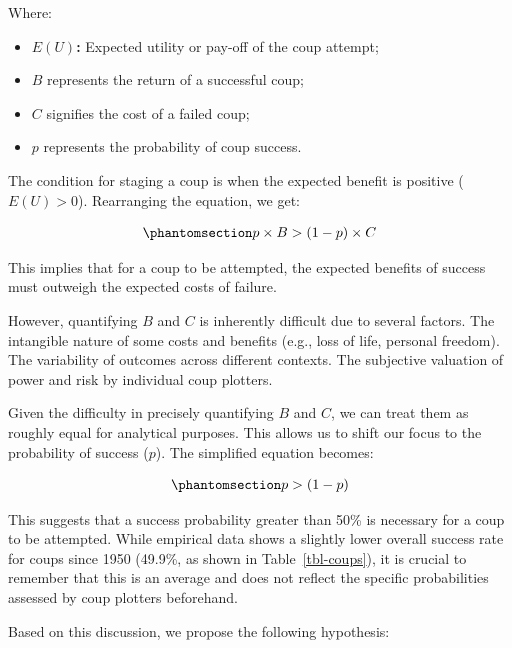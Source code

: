 \documentclass[
  12pt,
]{report}
\providecommand{\tightlist}{%
  \setlength{\itemsep}{0pt}\setlength{\parskip}{0pt}}\usepackage{longtable,booktabs,array}
\begin{document}
Where:

\begin{itemize}
\tightlist
\item
  \(E(U)\)\textbf{:} Expected utility or pay-off of the coup attempt;
\item
  \(B\) represents the return of a successful coup;
\item
  \(C\) signifies the cost of a failed coup;
\item
  \(p\) represents the probability of coup success.
\end{itemize}

The condition for staging a coup is when the expected benefit is
positive (\(E(U) > 0\)). Rearranging the equation, we get:

\begin{equation}\phantomsection\label{eq-eq2}{
\begin{aligned}
p \times B > (1 - p) \times C
\end{aligned}
}\end{equation}

This implies that for a coup to be attempted, the expected benefits of
success must outweigh the expected costs of failure.

However, quantifying \(B\) and \(C\) is inherently difficult due to
several factors. The intangible nature of some costs and benefits (e.g.,
loss of life, personal freedom). The variability of outcomes across
different contexts. The subjective valuation of power and risk by
individual coup plotters.

Given the difficulty in precisely quantifying \(B\) and \(C\), we can
treat them as roughly equal for analytical purposes. This allows us to
shift our focus to the probability of success (\(p\)). The simplified
equation becomes:

\begin{equation}\phantomsection\label{eq-eq3}{
\begin{aligned}
p > (1-p)
\end{aligned}
}\end{equation}

This suggests that a success probability greater than 50\% is necessary
for a coup to be attempted. While empirical data shows a slightly lower
overall success rate for coups since 1950 (49.9\%, as shown in
Table~\ref{tbl-coups}), it is crucial to remember that this is an
average and does not reflect the specific probabilities assessed by coup
plotters beforehand.

Based on this discussion, we propose the following hypothesis:
\end{document}
